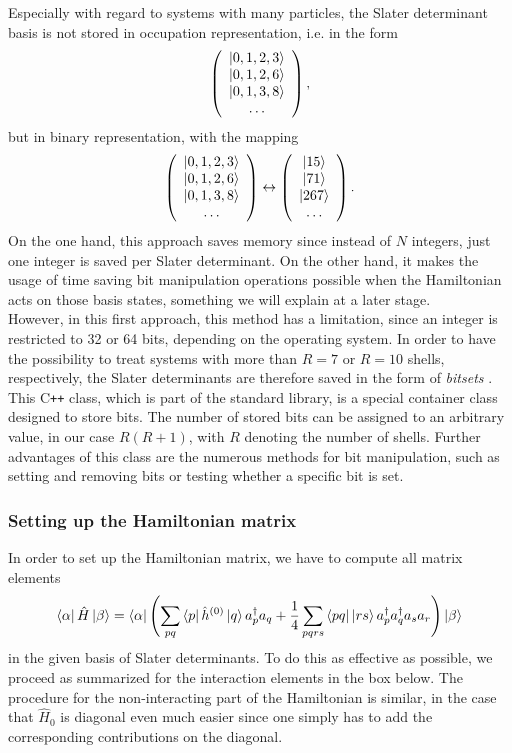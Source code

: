 Especially with regard to systems with many particles, the Slater determinant basis is not stored in occupation representation, i.e. in the form
\[
\left(\begin{array}{c}
|0,1,2,3\rangle \\
|0,1,2,6\rangle \\
|0,1,3,8\rangle \\
\dots
\end{array}\right),
\]
but in binary representation, with the mapping
\[
\left(\begin{array}{c}
|0,1,2,3\rangle \\
|0,1,2,6\rangle \\
|0,1,3,8\rangle \\
\dots
\end{array}\right)
\leftrightarrow
\left(\begin{array}{c}
|15\rangle \\
|71\rangle \\
|267\rangle \\
\dots
\end{array}\right).
\] 
 On the one hand, this approach saves memory since instead of $N$ integers, just one integer is saved per Slater determinant. On the other hand, it makes the usage of time saving bit manipulation operations possible when the Hamiltonian acts on those basis states, something we will explain at a later stage.\\
However, in this first approach, this method has a limitation, since an integer is restricted to 32 or 64 bits, depending on the operating system. In order to have the possibility to treat systems with more than $R=7$ or $R=10$ shells, respectively, the Slater determinants are therefore saved in the form of \textit{bitsets} \cite{C++}.  This C{}\verb!++! class, which is part of the standard library, is a special container class designed to store bits. The number of stored bits can be assigned to an arbitrary value, in our case $R(R+1)$, with $R$ denoting the number of shells. Further advantages of this class are the numerous methods for bit manipulation, such as setting and removing bits or testing whether a specific bit is set.

\subsubsection{Setting up the Hamiltonian matrix}

In order to set up the Hamiltonian matrix, we have to compute all matrix elements 
\[
\left\langle \alpha \right| \hat{H} \left| \beta \right\rangle = \left\langle \alpha \right|\left( \sum\limits_{pq}\left\langle p \right| \hat{h}^{(0)} \left| q \right\rangle a_p^\dagger a_q + \frac{1}{4}\sum\limits_{pqrs}\left\langle pq \right|\left| r s \right\rangle a_p^\dagger a_q^\dagger a_s a_r \right)\left| \beta \right\rangle
\]
 in the given basis of Slater determinants. To do this as effective as possible, we proceed as summarized for the interaction elements in the box below. The procedure for the non-interacting part of the Hamiltonian is similar, in the case that $\hat{H}_0$ is diagonal even much easier since one simply has to add the corresponding contributions on the diagonal.
 
